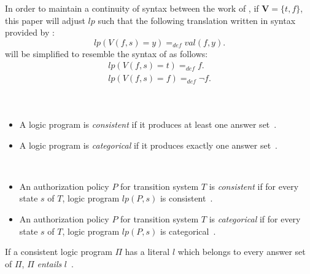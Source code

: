 In order to maintain a continuity of syntax between the work of \citet{gelfond_action_1998,balduccini_aaa_2008,blount_architecture_2013,gelfond_authorization_2008}, if $\boldsymbol{V} = \{t,f\}$, this paper will adjust $lp$ such that the following translation written in syntax provided by \citet{gelfond_authorization_2008}:
\[
    lp\left(V(f,s)=y\right) =_{def}
        val\left(f,y\right).
\]
will be simplified to resemble the syntax of \citet{gelfond_action_1998,balduccini_aaa_2008,blount_architecture_2013} as follows:
\begin{gather}
    lp\left(V(f,s)=t\right) =_{def}
        f. \\
    lp\left(V(f,s)=f\right) =_{def}
        \neg f. \\
\end{gather}

\begin{definition}
    \label{def:lp_consistent}
    \label{def:lp_categorical}
    ~

    \begin{itemize}
        \item A logic program is \textit{consistent} if it produces at least one answer set~\citep{gelfond_authorization_2008}.
        \item A logic program is \textit{categorical} if it produces exactly one answer set~\citep{gelfond_authorization_2008}.
    \end{itemize}
\end{definition}

\begin{definition}
    \label{def:authorization_consistent}
    \label{def:authorization_categorical}
    ~

    \begin{itemize}
        \item An authorization policy $P$ for transition system $T$ is \textit{consistent} if for every state $s$ of $T$, logic program $lp(P, s)$ is consistent~\citep{gelfond_authorization_2008}.
        \item An authorization policy $P$ for transition system $T$ is \textit{categorical} if for every state $s$ of $T$, logic program $lp(P, s)$ is categorical~\citep{gelfond_authorization_2008}.
    \end{itemize}
\end{definition}

\begin{definition}
    \label{def:entails}
    If a consistent logic program $\Pi$ has a literal $l$ which belongs to every answer set of $\Pi$, $\Pi$ \textit{entails} $l$~\citep{gelfond_authorization_2008}.
\end{definition}

